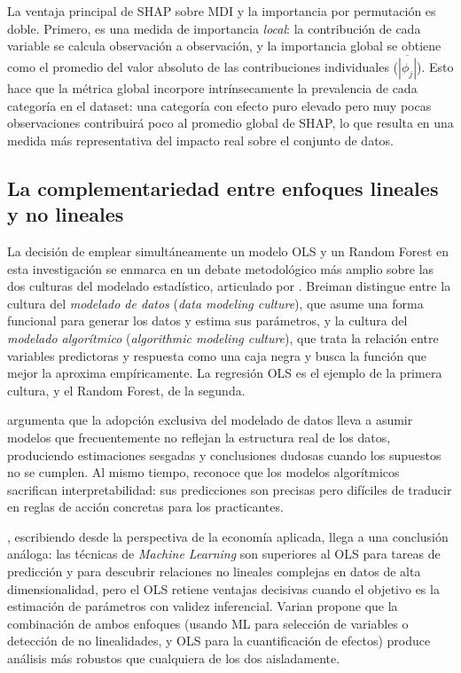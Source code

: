 \documentclass[12pt, a4paper]{report}
\begin{document}
La ventaja principal de SHAP sobre MDI y la importancia por permutación es doble.
Primero, es una medida de importancia \textit{local}: la contribución de cada
variable se calcula observación a observación, y la importancia global se obtiene
como el promedio del valor absoluto de las contribuciones individuales
($\overline{|\phi_j|}$). Esto hace que la métrica global incorpore intrínsecamente
la prevalencia de cada categoría en el dataset: una categoría con efecto puro elevado
pero muy pocas observaciones contribuirá poco al promedio global de SHAP, lo que
resulta en una medida más representativa del impacto real sobre el conjunto de datos.

\subsection{La complementariedad entre enfoques lineales y no lineales}

La decisión de emplear simultáneamente un modelo OLS y un Random Forest en esta
investigación se enmarca en un debate metodológico más amplio sobre las dos culturas
del modelado estadístico, articulado por \citet{breiman2001b}. Breiman distingue entre
la cultura del \textit{modelado de datos} (\textit{data modeling culture}), que asume
una forma funcional para generar los datos y estima sus parámetros, y la
cultura del \textit{modelado algorítmico} (\textit{algorithmic modeling culture}), que
trata la relación entre variables predictoras y respuesta como una caja negra y busca
la función que mejor la aproxima empíricamente. La regresión OLS es el ejemplo
de la primera cultura, y el Random Forest, de la segunda.

\citet{breiman2001b} argumenta que la adopción exclusiva del modelado de datos lleva a
asumir modelos que frecuentemente no reflejan la estructura real de los datos, produciendo
estimaciones sesgadas y conclusiones dudosas cuando los supuestos no se cumplen. Al mismo
tiempo, reconoce que los modelos algorítmicos sacrifican interpretabilidad: sus predicciones
son precisas pero difíciles de traducir en reglas de acción concretas para los practicantes.

\citet{varian2014}, escribiendo desde la perspectiva de la economía aplicada, llega a una
conclusión análoga: las técnicas de \textit{Machine Learning} son superiores al OLS para tareas
de predicción y para descubrir relaciones no lineales complejas en datos de alta dimensionalidad,
pero el OLS retiene ventajas decisivas cuando el objetivo es la estimación de parámetros con
validez inferencial. Varian propone que la combinación de ambos enfoques (usando ML para
selección de variables o detección de no linealidades, y OLS para la cuantificación de efectos)
produce análisis más robustos que cualquiera de los dos aisladamente.
\end{document}
